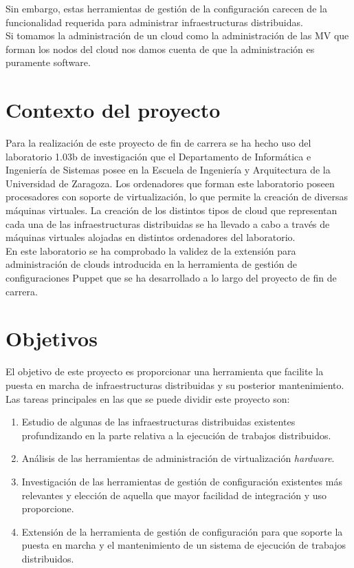 Sin embargo, estas herramientas de gestión de la configuración carecen de la funcionalidad requerida para administrar infraestructuras distribuidas.\\

Si tomamos la administración de un cloud como la administración de las MV que forman los nodos del cloud nos damos cuenta de que la administración es puramente software.\\


\section{Contexto del proyecto}

Para la realización de este proyecto de fin de carrera se ha hecho uso del laboratorio 1.03b de investigación que el Departamento de Informática e Ingeniería de Sistemas posee en la Escuela de Ingeniería y Arquitectura de la Universidad de Zaragoza. Los ordenadores que forman este laboratorio poseen procesadores con soporte de virtualización, lo que permite la creación de diversas máquinas virtuales. La creación de los distintos tipos de cloud que representan cada una de las infraestructuras distribuidas se ha llevado a cabo a través de máquinas virtuales alojadas en distintos ordenadores del laboratorio.\\

En este laboratorio se ha comprobado la validez de la extensión para administración de clouds introducida en la herramienta de gestión de configuraciones Puppet que se ha desarrollado a lo largo del proyecto de fin de carrera.


\section{Objetivos}

El objetivo de este proyecto es proporcionar una herramienta que facilite la puesta en marcha de infraestructuras distribuidas y su posterior mantenimiento. Las tareas principales en las que se puede dividir este proyecto son:

\begin{enumerate}
\item Estudio de algunas de las infraestructuras distribuidas existentes profundizando en la parte relativa a la ejecución de trabajos distribuidos.
\item Análisis de las herramientas de administración de virtualización \emph{hardware}.
\item Investigación de las herramientas de gestión de configuración existentes más relevantes y elección de aquella que mayor facilidad de integración y uso proporcione.
\item Extensión de la herramienta de gestión de configuración para que soporte la puesta en marcha y el mantenimiento de un sistema de ejecución de trabajos distribuidos.
\end{enumerate}


